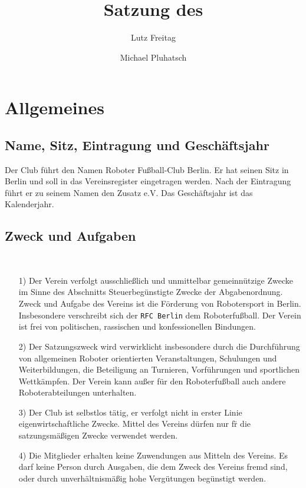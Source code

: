 \documentclass[11pt,a4paper]{scrartcl}
\author{Lutz Freitag \and Michael Pluhatsch}
\title{Satzung des \RFC}
\newcommand{\RFC}{\texttt{RFC Berlin}\xspace}
\begin{document}
\maketitle
\section{Allgemeines}
\subsection{Name, Sitz, Eintragung und Gesch\"aftsjahr}\label{sec:scope}
Der Club f\"uhrt den Namen \glqq Roboter Fußball-Club Berlin\grqq. Er hat seinen Sitz in Berlin und 
soll in das Vereinsregister eingetragen werden. Nach der Eintragung f\"uhrt er zu seinem Namen den Zusatz e.V. Das Gesch\"aftsjahr ist das Kalenderjahr.

\subsection{Zweck und Aufgaben}~\label{sec:purpose}
\begin{itemize}
    \item[1)] Der  Verein  verfolgt  ausschließlich  und  unmittelbar  gemeinnützige Zwecke  im  Sinne  des Abschnitts \glqq Steuerbeg\"unstigte Zwecke\grqq{} der Abgabenordnung. Zweck und Aufgabe des Vereins ist die F\"orderung von Robotersport in Berlin. Insbesondere verschreibt sich der \RFC dem Roboterfußball. Der Verein ist frei von politischen, rassischen und konfessionellen Bindungen. 
    \item[2)] Der Satzungszweck wird verwirklicht insbesondere durch die Durchführung von allgemeinen Roboter orientierten Veranstaltungen, Schulungen und Weiterbildungen, die Beteiligung an Turnieren, Vorführungen und sportlichen Wettkämpfen. Der Verein kann außer für den Roboterfußball auch andere Roboterabteilungen unterhalten. 
 	\item[3)] Der Club ist selbstlos t\"atig, er verfolgt nicht in erster Linie eigenwirtschaftliche Zwecke. Mittel des Vereins d\"urfen nur f\"r die satzungsmäßigen Zwecke verwendet werden.
 	\item[4)] Die Mitglieder  erhalten  keine  Zuwendungen  aus  Mitteln  des  Vereins.  Es  darf  keine  Person durch Ausgaben, die dem Zweck des Vereins fremd sind, oder durch unverh\"altnismäßig hohe Vergütungen beg\"unstigt werden.
\end{itemize}
\end{document}
